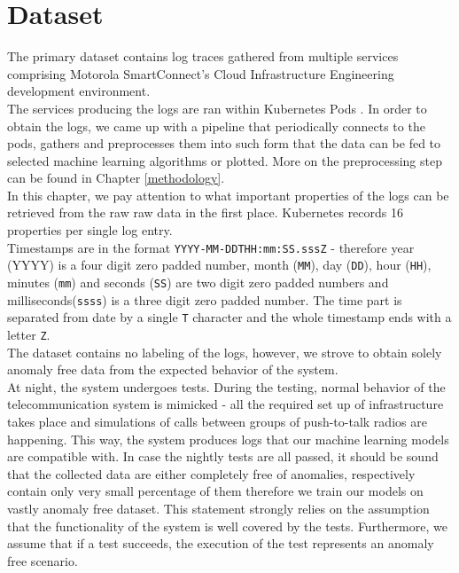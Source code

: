 \chapter{Dataset}

The primary dataset contains log traces gathered from multiple services comprising Motorola SmartConnect's Cloud Infrastructure Engineering development environment.\\
The services producing the logs are ran within Kubernetes Pods \cite{K8s:pods}. In order to obtain the logs, we came up with a pipeline that periodically connects to the pods, gathers and preprocesses them into such form that the data can be fed to selected machine learning algorithms or plotted. More on the preprocessing step can be found in Chapter \ref{methodology}. \\
In this chapter, we pay attention to what important properties of the logs can be retrieved from the raw raw data in the first place.
Kubernetes records 16 properties per single log entry.\\
Timestamps are in the format \texttt{YYYY-MM-DDTHH:mm:SS.sssZ} - therefore year (YYYY) is a four digit zero padded number, month (\texttt{MM}), day (\texttt{DD}), hour (\texttt{HH}), minutes (\texttt{mm}) and seconds (\texttt{SS}) are two digit zero padded numbers and milliseconds(\texttt{ssss}) is a three digit zero padded number. The time part is separated from date by a single \texttt{T} character and the whole timestamp ends with a letter \texttt{Z}.\\

The dataset contains no labeling of the logs, however, we strove to obtain solely anomaly free data from the expected behavior of the system.\\
At night, the system undergoes tests. During the testing, normal behavior of the telecommunication system is mimicked - all the required set up of infrastructure takes place and simulations of calls between groups of push-to-talk radios are happening. This way, the system produces logs that our machine learning models are compatible with.
In case the nightly tests are all passed, it should be sound that the collected data are either completely free of anomalies, respectively contain only very small percentage of them therefore we train our models on vastly anomaly free dataset. This statement strongly relies on the assumption that the functionality of the system is well covered by the tests. 
Furthermore, we assume that if a test succeeds, the execution of the test represents an anomaly free scenario.

